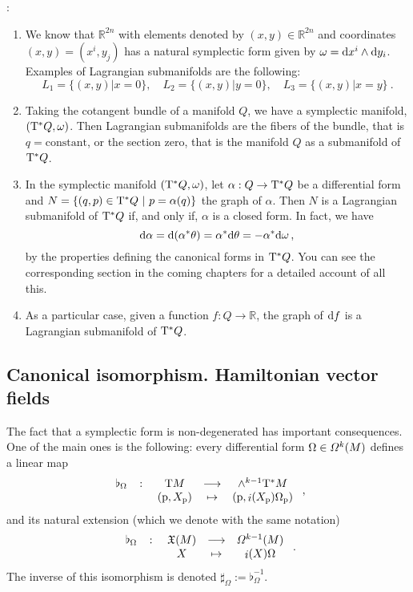 \documentclass[12pt]{report}
\def\vf{\mathfrak X}
\def\df{{\mit\Omega}}
\def\d{{\rm d}}
\def\Real{\mathbb{R}}
\def\Tan{{\rm T}}
\def\inn{\mathop{i}\nolimits}
\begin{document}
\bigskip
{}:
\begin{enumerate}
\item We know that $\Real^{2n}$ with elements denoted by $(x,y)\in\Real^{2n}$ and coordinates $(x,y)=(x^{i} ,y_{j})$ has a natural symplectic form given by $\omega= \d x^{i}\wedge\d y_{i}$. Examples of Lagrangian submanifolds are the following:
$$
L_{1}=\{(x,y)|x=0\} ,\quad
L_{2}=\{(x,y)|y=0\} ,\quad
L_{3}=\{(x,y)|x=y\} \ .
$$
\item Taking the cotangent bundle of a manifold $Q$, we have a symplectic manifold, $(\Tan^*Q,\omega)$. Then Lagrangian submanifolds are the fibers of the bundle, that is $q=\mathrm{constant}$, or the section zero, that is the manifold $Q$ as a submanifold of $\Tan^*Q$.
\item In the symplectic manifold $(\Tan^*Q,\omega)$, let $\alpha:Q\to\Tan^*Q$ be a differential form and $N=\{(q,p)\in\Tan^*Q\ | \ p=\alpha(q)\}$ the graph of $\alpha$. Then $N$ is a Lagrangian submanifold of $\Tan^*Q$ if, and only if, $\alpha$ is a closed form. In fact, we have
$$
\d\alpha=\d(\alpha^{*}\theta)=\alpha^{*}\d\theta=-\alpha^{*}\d\omega\, ,
$$
by the properties defining the canonical forms in $\Tan^*Q$. You can see the corresponding section in the coming chapters for a detailed account of all this.
\item As a particular case, given a function $f:Q\to\Real$, the graph of $\d f$ is a Lagrangian submanifold of $\Tan^*Q$.
\end{enumerate}



\subsection{Canonical isomorphism. Hamiltonian vector fields}
\protect\label{icch}


The fact that a symplectic form is non-degenerated
has important consequences. One of the main ones is the following:
every differential form $\Omega\in\df^k(M)$
defines a linear map
$$
\begin{array}{ccccc}
\flat_\Omega & \colon & \Tan M & \longrightarrow &\wedge^{k-1} \Tan^*M
\\
 & & ({\rm p},X_{\rm p}) & \mapsto & ({\rm p},\inn(X_{\rm p})\Omega_{\rm p})
\end{array} \ ,
$$
and its natural extension (which we denote with the same notation)
$$
\begin{array}{ccccc}
\flat_\Omega & \colon & \vf (M) & \longrightarrow & {\mit\Omega}^{k-1}(M)
\\
 & & X & \mapsto & \inn(X)\Omega
\end{array} \ .
$$
The inverse of this isomorphism is denoted $\sharp_\Omega:=\flat_\Omega^{-1}$.
\end{document}
